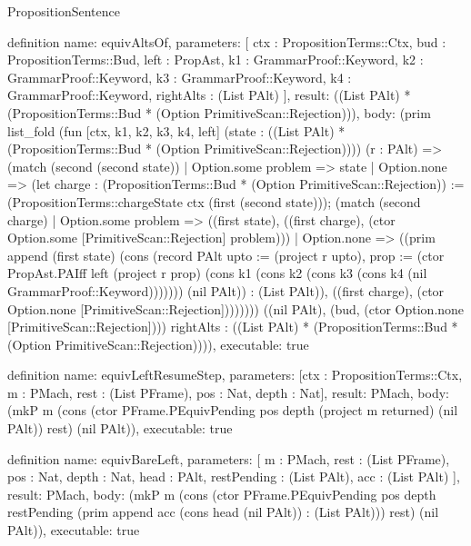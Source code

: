 \begin{lexlean}{PropositionSentence}
\begin{semanticmodule}
definition{
  name: equivAltsOf,
  parameters: [
    ctx : PropositionTerms::Ctx,
    bud : PropositionTerms::Bud,
    left : PropAst,
    k1 : GrammarProof::Keyword,
    k2 : GrammarProof::Keyword,
    k3 : GrammarProof::Keyword,
    k4 : GrammarProof::Keyword,
    rightAlts : (List PAlt)
  ],
  result: ((List PAlt) * (PropositionTerms::Bud * (Option PrimitiveScan::Rejection))),
  body: (prim list_fold (fun [ctx, k1, k2, k3, k4, left] (state : ((List PAlt) * (PropositionTerms::Bud * (Option PrimitiveScan::Rejection)))) (r : PAlt) => (match (second (second state))
    | Option.some problem => state
    | Option.none => (let charge : (PropositionTerms::Bud * (Option PrimitiveScan::Rejection)) := (PropositionTerms::chargeState ctx (first (second state))); (match (second charge)
        | Option.some problem => ((first state), ((first charge), (ctor Option.some [PrimitiveScan::Rejection] problem)))
        | Option.none => ((prim append (first state) (cons (record PAlt {upto := (project r upto), prop := (ctor PropAst.PAIff left (project r prop) (cons k1 (cons k2 (cons k3 (cons k4 (nil GrammarProof::Keyword))))))}) (nil PAlt)) : (List PAlt)), ((first charge), (ctor Option.none [PrimitiveScan::Rejection]))))))) ((nil PAlt), (bud, (ctor Option.none [PrimitiveScan::Rejection]))) rightAlts : ((List PAlt) * (PropositionTerms::Bud * (Option PrimitiveScan::Rejection)))),
  executable: true
}

definition{
  name: equivLeftResumeStep,
  parameters: [ctx : PropositionTerms::Ctx, m : PMach, rest : (List PFrame), pos : Nat, depth : Nat],
  result: PMach,
  body: (mkP m (cons (ctor PFrame.PEquivPending pos depth (project m returned) (nil PAlt)) rest) (nil PAlt)),
  executable: true
}

definition{
  name: equivBareLeft,
  parameters: [
    m : PMach,
    rest : (List PFrame),
    pos : Nat,
    depth : Nat,
    head : PAlt,
    restPending : (List PAlt),
    acc : (List PAlt)
  ],
  result: PMach,
  body: (mkP m (cons (ctor PFrame.PEquivPending pos depth restPending (prim append acc (cons head (nil PAlt)) : (List PAlt))) rest) (nil PAlt)),
  executable: true
}


\end{semanticmodule}
\end{lexlean}
